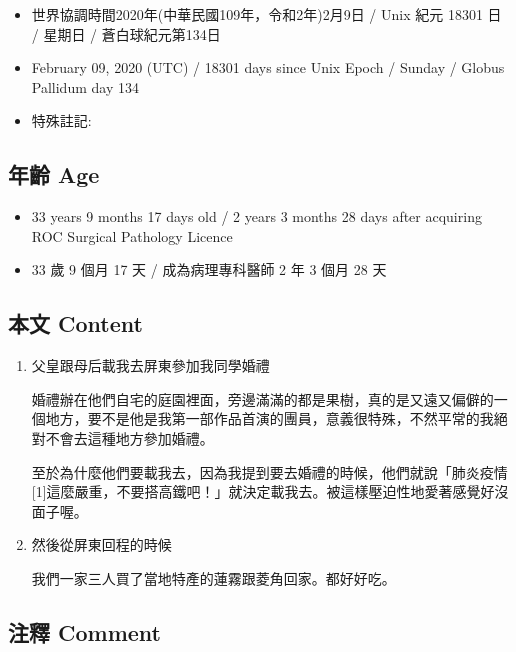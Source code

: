 \documentclass[
]{article}
\providecommand{\tightlist}{%
  \setlength{\itemsep}{0pt}\setlength{\parskip}{0pt}}
\begin{document}
\begin{itemize}
\tightlist
\item
  世界協調時間2020年(中華民國109年，令和2年)2月9日 / Unix 紀元 18301 日
  / 星期日 / 蒼白球紀元第134日
\item
  February 09, 2020 (UTC) / 18301 days since Unix Epoch / Sunday /
  Globus Pallidum day 134
\item
  特殊註記:
\end{itemize}

\hypertarget{ux5e74ux9f61-age-70}{%
\subsection{年齡 Age}\label{ux5e74ux9f61-age-70}}

\begin{itemize}
\tightlist
\item
  33 years 9 months 17 days old / 2 years 3 months 28 days after
  acquiring ROC Surgical Pathology Licence
\item
  33 歲 9 個月 17 天 / 成為病理專科醫師 2 年 3 個月 28 天
\end{itemize}

\hypertarget{ux672cux6587-content-70}{%
\subsection{本文 Content}\label{ux672cux6587-content-70}}

\begin{enumerate}
\def\labelenumi{\arabic{enumi}.}
\item
  父皇跟母后載我去屏東參加我同學婚禮

  婚禮辦在他們自宅的庭園裡面，旁邊滿滿的都是果樹，真的是又遠又偏僻的一個地方，要不是他是我第一部作品首演的團員，意義很特殊，不然平常的我絕對不會去這種地方參加婚禮。

  至於為什麼他們要載我去，因為我提到要去婚禮的時候，他們就說「肺炎疫情{[}1{]}這麼嚴重，不要搭高鐵吧！」就決定載我去。被這樣壓迫性地愛著感覺好沒面子喔。
\item
  然後從屏東回程的時候

  我們一家三人買了當地特產的蓮霧跟菱角回家。都好好吃。
\end{enumerate}

\hypertarget{ux6ce8ux91cb-comment-69}{%
\subsection{注釋 Comment}\label{ux6ce8ux91cb-comment-69}}
\end{document}
